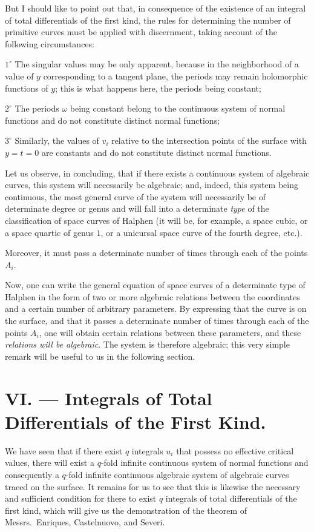 \documentclass{article}
\begin{document}
But I should like to point out that, in consequence of the existence of an integral of total differentials of the first kind, the rules for determining the number of primitive curves must be applied with discernment, taking account of the following circumstances:

$1^\circ$ The singular values may be only apparent, because in the neighborhood of a value of $y$ corresponding to a tangent plane, the periods may remain holomorphic functions of $y$; this is what happens here, the periods being constant;

$2^\circ$ The periods $\omega$ being constant belong to the continuous system of normal functions and do not constitute distinct normal functions;

$3^\circ$ Similarly, the values of $v_{i}$ relative to the intersection points of the surface with $y = t = 0$ are constants and do not constitute distinct normal functions.

Let us observe, in concluding, that if there exists a continuous system of algebraic curves, this system will necessarily be algebraic; and, indeed, this system being continuous, the most general curve of the system will necessarily be of determinate degree or genus and will fall into a determinate \emph{type} of the classification of space curves of Halphen (it will be, for example, a space cubic, or a space quartic of genus $1$, or a unicursal space curve of the fourth degree, etc.).

Moreover, it must pass a determinate number of times through each of the points $A_{i}$.

Now, one can write the general equation of space curves of a determinate type of Halphen in the form of two or more algebraic relations between the coordinates and a certain number of arbitrary parameters. By expressing that the curve is on the surface, and
that it passes a determinate number of times through each of the points $A_{i}$, one will obtain certain relations between these parameters, and these \emph{relations will be algebraic}. The system is therefore algebraic; this very simple remark will be useful to us in the following section.

\section*{VI. --- Integrals of Total Differentials of the First Kind.}

We have seen that if there exist $q$ integrals $u_{i}$ that possess no effective critical values, there will exist a $q$-fold infinite continuous system of normal functions and consequently a $q$-fold infinite continuous algebraic system of algebraic curves traced on the surface. It remains for us to see that this is likewise the necessary and sufficient condition for there to exist $q$ integrals of total differentials of the first kind, which will give us the demonstration of the theorem of Messrs.~Enriques, Castelnuovo, and Severi.
\end{document}
